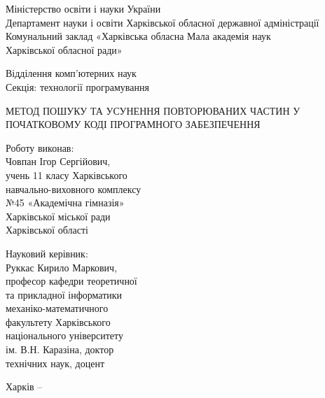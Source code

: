 \documentclass[a4paper, 14pt]{article}
\begin{document}
\thispagestyle{empty}
\begin{spacing}{1}
\begin{center}
Міністерство освіти і науки України \\
Департамент науки і освіти Харківської обласної державної адміністрації \\
Комунальний заклад «Харківська обласна Мала академія наук \\ Харківської обласної ради» \\
\end{center}\par\null\par
\begin{center}
Відділення комп'ютерних наук\\
Секція: технології програмування
\end{center}\par\null\par
\begin{center}
МЕТОД ПОШУКУ ТА УСУНЕННЯ ПОВТОРЮВАНИХ
ЧАСТИН У ПОЧАТКОВОМУ КОДІ ПРОГРАМНОГО ЗАБЕЗПЕЧЕННЯ
\end{center}\par\null\par\null
\begin{changemargin}{9.75cm}{0cm}
Роботу виконав:\\ 
Човпан Ігор Сергійович,\\
учень 11 класу Харківського\\
навчально-виховного комплексу\\
№45 «Академічна гімназія»\\
Харківської міської ради\\
Харківської області
\end{changemargin}\par
\begin{changemargin}{9.75cm}{0cm}
Науковий керівник:\\
Руккас Кирило Маркович,\\
професор кафедри теоретичної\\
та прикладної інформатики\\
механіко-математичного\\
факультету Харківського\\
національного університету\\
ім. В.Н. Каразіна, доктор\\
технічних наук, доцент\\
\vspace*{\fill}\end{changemargin}
\begin{center}
Харків -- \the\year{}
\end{center}\end{spacing}
\end{document}
